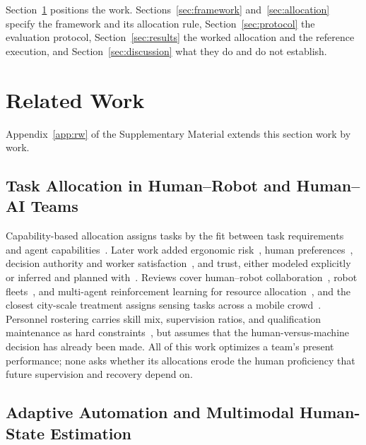 \documentclass[utf8]{FrontiersinHarvard}
\begin{document}
	Section~\ref{sec:relatedwork} positions the work. Sections~\ref{sec:framework} and~\ref{sec:allocation} specify the framework and its allocation rule, Section~\ref{sec:protocol} the evaluation protocol, Section~\ref{sec:results} the worked allocation and the reference execution, and Section~\ref{sec:discussion} what they do and do not establish.

	\section{Related Work}
	\label{sec:relatedwork}

	Appendix~\ref{app:rw} of the Supplementary Material extends this section work by work.

	\subsection{Task Allocation in Human--Robot and Human--AI Teams}
	\label{sec:rw-alloc}

	Capability-based allocation assigns tasks by the fit between task requirements and agent capabilities~\citep{Ranz2017,Dorri2018}. Later work added ergonomic risk~\citep{Makrini2019,Merlo2023}, human preferences~\citep{Noormohammadi2025}, decision authority and worker satisfaction~\citep{Gombolay2015}, and trust, either modeled explicitly~\citep{Ali2022} or inferred and planned with~\citep{Chen2018}. Reviews cover human--robot collaboration~\citep{Ajoudani2018}, robot fleets~\citep{MeseguerValenzuela2025}, and multi-agent reinforcement learning for resource allocation~\citep{Hady2025}, and the closest city-scale treatment assigns sensing tasks across a mobile crowd~\citep{Zhao2023}. Personnel rostering carries skill mix, supervision ratios, and qualification maintenance as hard constraints~\citep{Burke2004,VandenBergh2013}, but assumes that the human-versus-machine decision has already been made. All of this work optimizes a team's present performance; none asks whether its allocations erode the human proficiency that future supervision and recovery depend on.

	\subsection{Adaptive Automation and Multimodal Human-State Estimation}
	\label{sec:rw-adaptive}
\end{document}
